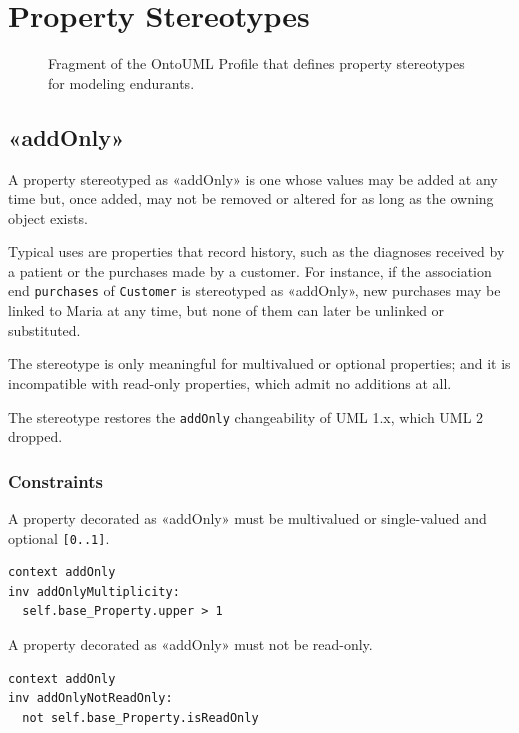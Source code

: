 \section{Property Stereotypes}

\begin{figure}[h]
    \centering
    
    \caption{Fragment of the OntoUML Profile that defines property stereotypes for modeling endurants.}
    \label{fig:endurant-properties-profile}
\end{figure}

\subsection{«addOnly»}
\label{stereotype:addOnly}

A property stereotyped as «addOnly» is one whose values may be added at any time but, once added, may not be removed or altered for as long as the owning object exists.

Typical uses are properties that record history, such as the diagnoses received by a patient or the purchases made by a customer. For instance, if the association end \texttt{purchases} of \texttt{Customer} is stereotyped as «addOnly», new purchases may be linked to Maria at any time, but none of them can later be unlinked or substituted.

The stereotype is only meaningful for multivalued or optional properties; and it is incompatible with read-only properties, which admit no additions at all.

The stereotype restores the \texttt{addOnly} changeability of UML 1.x, which UML 2 dropped.


\subsubsection{Constraints}

\begin{constraint}
\label{constraint:addOnlyMultiplicity}
A property decorated as «addOnly» must be multivalued or single-valued and optional \texttt{[0..1]}.

\begin{lstlisting}[language=OCL]
context addOnly
inv addOnlyMultiplicity:
  self.base_Property.upper > 1
\end{lstlisting}
\end{constraint}

\begin{constraint}
\label{constraint:addOnlyNotReadOnly}
A property decorated as «addOnly» must not be read-only.

\begin{lstlisting}[language=OCL]
context addOnly
inv addOnlyNotReadOnly:
  not self.base_Property.isReadOnly
\end{lstlisting}
\end{constraint}